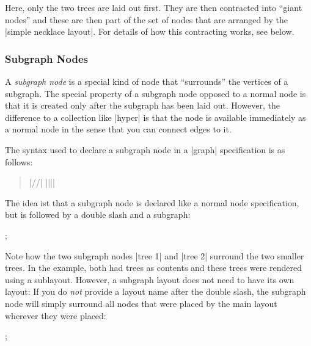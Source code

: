 Here, only the two trees are laid out first. They are then
contracted into ``giant nodes'' and these are then part of the set
of nodes that are arranged by the |simple necklace layout|. For details of
how this contracting works, see below.


\subsubsection{Subgraph Nodes}

A \emph{subgraph node} is a special kind of node that ``surrounds''
the vertices of a subgraph. The special property of a subgraph node
opposed to a normal node is that it is created only after the subgraph
has been laid out. However, the difference to a collection like
|hyper| is that the node is available immediately as a normal node in
the sense that you can connect edges to it.

The syntax used to declare a subgraph node in a |graph| specification
is as follows:

\begin{quote}
  |//|  |{||}|
\end{quote}

The idea ist that a subgraph node is declared like a normal node
specification, but is followed by a double slash and a subgraph:

\begin{codeexample}[width=5cm] 
\tikz {};
\end{codeexample}  

Note how the two subgraph nodes |tree 1| and |tree 2| surround the two
smaller trees. In the example, both had trees as contents and these
trees were rendered using a sublayout. However, a subgraph layout does
not need to have its own layout: If you do \emph{not} provide a layout
name after the double slash, the subgraph node will simply surround
all nodes that were placed by the main layout wherever they were
placed:

\begin{codeexample}[] 
\tikz [subgraph text bottom=text centered,
       subgraph nodes={font=\itshape}]
  ;
\end{codeexample}  



